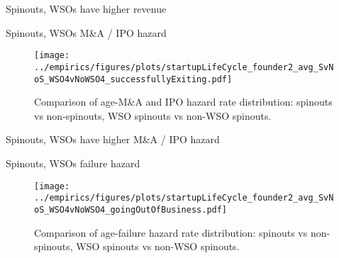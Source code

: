 \documentclass[english,usenames,dvipsnames]{beamer}
\begin{document}
\begin{frame}{Spinouts, WSOs have higher revenue}
\begin{table}
\tiny
\centering

\caption{\footnotesize The regresssions above compare \textbf{\alert{revenue}} in WSO4 spinouts, non-WSO4 spinouts and non-spinouts. The first regression uses no controls. The following three regressions in addition control for year effects, age effects, and / or cohort effects, in each case allowing the relevant effect to differ by State-NAICS4 combination. Standard errors are multi-way clustered at the state, NAICS4 and year levels.}
\end{table}
\end{frame}

\begin{frame}{Spinouts, WSOs M\&A / IPO hazard}
\begin{figure}
	\centering
	\texttt{[image: ../empirics/figures/plots/startupLifeCycle\_founder2\_avg\_SvNoS\_WSO4vNoWSO4\_successfullyExiting.pdf]}
	\caption{Comparison of age-M\&A and IPO hazard rate distribution: spinouts vs non-spinouts, WSO spinouts vs non-WSO spinouts.}
\end{figure}
\end{frame}

\begin{frame}{Spinouts, WSOs have higher M\&A / IPO hazard}
\begin{table}
\tiny
\centering

\caption{\footnotesize The regresssions above compare the \textbf{\alert{M\&A and IPO hazard rate}} in WSO4 spinouts, non-WSO4 spinouts and non-spinouts. The first regression uses no controls. The following three regressions in addition control for year effects, age effects, and / or cohort effects, in each case allowing the relevant effect to differ by State-NAICS4 combination. Standard errors are multi-way clustered at the state, NAICS4 and year levels.}
\end{table}
\end{frame}

\begin{frame}{Spinouts, WSOs failure hazard}
\begin{figure}
	\centering
	\texttt{[image: ../empirics/figures/plots/startupLifeCycle\_founder2\_avg\_SvNoS\_WSO4vNoWSO4\_goingOutOfBusiness.pdf]}
	\caption{Comparison of age-failure hazard rate distribution: spinouts vs non-spinouts, WSO spinouts vs non-WSO spinouts.}
\end{figure}
\end{frame}
\end{document}

